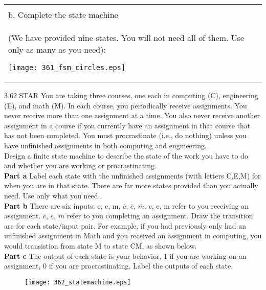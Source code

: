 \documentclass{patt}
\begin{document}
\begin{exercises}
\begin{tabular} {m{8cm} m{10cm}}
\vspace{0.3in}

& 

\\
b. Complete the state machine \\ (We have provided nine states. You will not need all of them.  Use only as many as you need):

\texttt{[image: 361\_fsm\_circles.eps]}

\end{tabular}

\item[3.62]STAR You are taking three courses, one each in computing (C),
engineering (E), and math (M).  In each course, you periodically receive
assignments.  You never receive more than one assignment at a time.  You also
never receive another assignment in a course if you currently have an
assignment in that course that has not been completed.  You must
procrastinate (i.e., do nothing) unless you have unfinished assignments in
both computing and engineering. \\ 

\vspace{0.2in}
\noindent
Design a finite state machine to describe the state of the work you have to do
and whether you are working or procrastinating. \\ 

\vspace{0.2in}
\noindent
{\bf Part a} Label each state with the unfinished assignments (with letters C,E,M)
for when you are in that state.  There are far more states
provided than you actually need.  Use only what you need. \\ 

\vspace{0.2in}
\noindent
{\bf Part b} There are six inputs: c, e, m, $\overline{c}$, $\overline{e}$, $\overline{m}$.
c, e, m refer to you receiving an assignment. $\overline{c}$, $\overline{e}$,
$\overline{m}$ refer to you completing an assignment.  Draw the transition arc
for each state/input pair.  For example, if you had previously only had an
unfinished assignment in Math and you received an assignment in computing,
you would transistion from state M to state CM, as shown below. \\ 

\vspace{0.2in}
\noindent
{\bf Part c} The output of each state is your behavior, 1 if you are
working on an assignment, 0 if you are procrastinating.  Label the outputs
of each state. \\ 

\hspace{2.0in}
\begin{figure}[h]
\centering
\texttt{[image: 362\_statemachine.eps]}
\end{figure}

\end{exercises}
\end{document}
